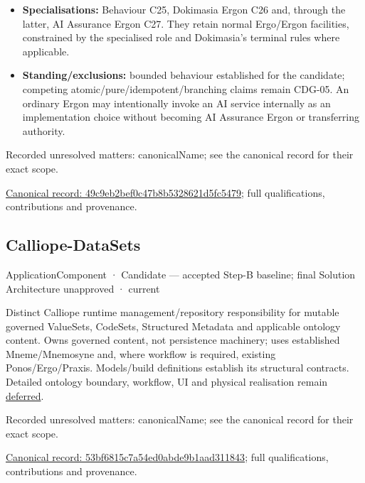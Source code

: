\begin{itemize}
\item \textbf{Specialisations:} Behaviour C25, Dokimasia Ergon C26 and, through the latter,
  AI Assurance Ergon C27. They retain normal Ergo/Ergon facilities, constrained
  by the specialised role and Dokimasia's terminal rules where applicable.

\item \textbf{Standing/exclusions:} bounded behaviour established for the candidate;
  competing atomic/pure/idempotent/branching claims remain CDG-05. An ordinary
  Ergon may intentionally invoke an AI service internally as an implementation
  choice without becoming AI Assurance Ergon or transferring authority.

\end{itemize}

{\small Recorded unresolved matters: canonicalName; see the canonical record for their exact scope.}\par
{\footnotesize \href{../../../../continuum/application/application-component/49c9eb2bef0c47b8b5328621d5fc5479.md}{Canonical record: 49c9eb2bef0c47b8b5328621d5fc5479}; full qualifications, contributions and provenance.}\par
\subsection{Calliope-DataSets}

\label{element:53bf6815c7a54ed0abde9b1aad311843}
{\small ApplicationComponent · Candidate — accepted Step-B baseline; final Solution Architecture unapproved · current}\par

Distinct Calliope runtime management/repository responsibility for mutable governed
ValueSets, CodeSets, Structured Metadata and applicable ontology content. Owns
governed content, not persistence machinery; uses established Mneme/Mnemosyne and,
where workflow is required, existing Ponos/Ergo/Praxis. Models/build definitions
establish its structural contracts. Detailed ontology boundary, workflow, UI and
physical realisation remain \hyperref[element:466ad8f75a954c0581b5bba090443849]{deferred}.


{\small Recorded unresolved matters: canonicalName; see the canonical record for their exact scope.}\par
{\footnotesize \href{../../../../continuum/application/application-component/53bf6815c7a54ed0abde9b1aad311843.md}{Canonical record: 53bf6815c7a54ed0abde9b1aad311843}; full qualifications, contributions and provenance.}\par
